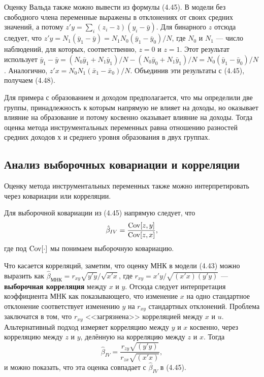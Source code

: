 Оценку Вальда также можно вывести из формулы (4.45). В модели без свободного члена переменные выражены в отклонениях от своих средних значений, а потому $z'y = \sum_i (z_i - \bar{z})(y_i - \bar{y})$. Для бинарного $z$ отсюда следует, что $z'y = N_1 (\bar{y}_1-\bar{y}) = N_1 N_0 (\bar{y}_1-\bar{y}_0)/N$, где $N_0$ и $N_1$ --- число наблюдений, для которых, соответственно, $z=0$ и $z=1$.  Этот результат использует $\bar{y}_1 - \bar{y} = (N_0 \bar{y}_1 + N_1 \bar{y}_1)/N - (N_0 \bar{y}_0 + N_1 \bar{y}_1)/N = N_0 (\bar{y}_1-\bar{y}_0)/N$. Аналогично, $z'x = N_0 N_1 (\bar{x}_1-\bar{x}_0)/N$. Объединив эти результаты с (4.45), получаем (4.48).

Для примера с образованием и доходом предполагается, что мы определили две группы, принадлежность к которым напрямую не влияет на доходы, но оказывает влияние на образование и потому косвенно оказывает влияние на доходы. Тогда оценка метода инструментальных переменных равна отношению разностей средних доходов х и среднего уровня образования в двух группах.

\subsection{Анализ выборочных ковариации и корреляции}
Оценку метода инструментальных переменных также можно интерпретировать через ковариации или корреляции. 

Для выборочной ковариации из (4.45) напрямую следует, что 
\begin{equation}
\hat{\beta}_{IV} = \frac{\mathrm{Cov}[z,y]}{\mathrm{Cov}[z,x]},
\end{equation}
где под $\mathrm{Cov}[\cdot]$ мы понимаем выборочную ковариацию.

Что касается корреляций, заметим, что оценку МНК в модели (4.43) можно выразить как $\hat{\beta}_{\text{МНК}} = r_{xy}\sqrt{y'y}/\sqrt{x'x}$, где $r_{xy} = x'y/\sqrt{(x'x)(y'y)}$ --- \textbf{выборочная корреляция} между $x$ и $y$.  Отсюда следует интерпретация коэффициента МНК как показывающего, что изменение $x$ на одно стандартное отклонение соответствует изменению $y$ на $r_{xy}$ стандартных отклонений. Проблема заключатся в том, что $r_{xy}$ <<загрязнена>> корреляцией между $x$ и $u$. Альтернативный подход измеряет корреляцию между $y$ и $x$ косвенно, через корреляцию между $z$ и $y$, делённую на корреляцию между $z$ и $x$.  Тогда
\begin{equation}
\hat{\beta}_{IV} = \frac{r_{zy}\sqrt{(y'y)}}{r_{zx}\sqrt{(x'x)}},
\end{equation}
и можно показать, что эта оценка совпадает с $\hat{\beta}_{IV}$ в (4.45).

